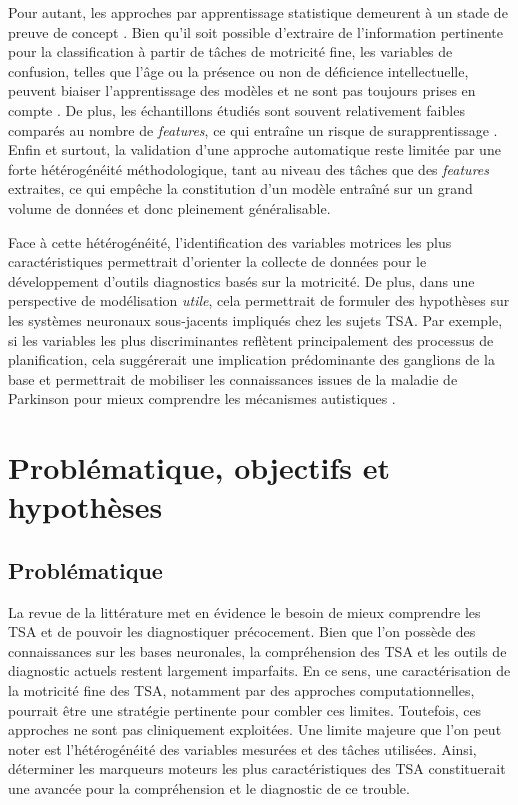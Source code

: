 Pour autant, les approches par apprentissage statistique demeurent à un stade de preuve de concept \parencite{Doctor2025Jul}. Bien qu'il soit possible d'extraire de l'information pertinente pour la classification à partir de tâches de motricité fine, les variables de confusion, telles que l'âge ou la présence ou non de déficience intellectuelle, peuvent biaiser l'apprentissage des modèles et ne sont pas toujours prises en compte \parencite{cavallo_identifying_2021}. De plus, les échantillons étudiés sont souvent relativement faibles comparés au nombre de \textit{features}, ce qui entraîne un risque de surapprentissage%
. Enfin et surtout, la validation d'une approche automatique reste limitée par une forte hétérogénéité méthodologique, tant au niveau des tâches que des \textit{features} extraites, ce qui empêche la constitution d'un modèle entraîné sur un grand volume de données et donc pleinement généralisable.

Face à cette hétérogénéité, l'identification des variables motrices les plus caractéristiques permettrait d'orienter la collecte de données pour le développement d'outils diagnostics basés sur la motricité. De plus, dans une perspective de modélisation \textit{utile}, cela permettrait de formuler des hypothèses sur les systèmes neuronaux sous-jacents impliqués chez les sujets TSA. Par exemple, si les variables les plus discriminantes reflètent principalement des processus de planification, cela suggérerait une implication prédominante des ganglions de la base et permettrait de mobiliser les connaissances issues de la maladie de Parkinson pour mieux comprendre les mécanismes autistiques \parencite{Rinehart2006Aug}.

\chapter{Problématique, objectifs et hypothèses}

\section{Problématique}
La revue de la littérature met en évidence le besoin de mieux comprendre les TSA et de pouvoir les diagnostiquer précocement. Bien que l'on possède des connaissances sur les bases neuronales, la compréhension des TSA et les outils de diagnostic actuels restent largement imparfaits. En ce sens, une caractérisation de la motricité fine des TSA, notamment par des approches computationnelles, pourrait être une stratégie pertinente pour combler ces limites. Toutefois, ces approches ne sont pas cliniquement exploitées. Une limite majeure que l'on peut noter est l'hétérogénéité des variables mesurées et des tâches utilisées. Ainsi, déterminer les marqueurs moteurs les plus caractéristiques des TSA constituerait une avancée pour la compréhension et le diagnostic de ce trouble. 


